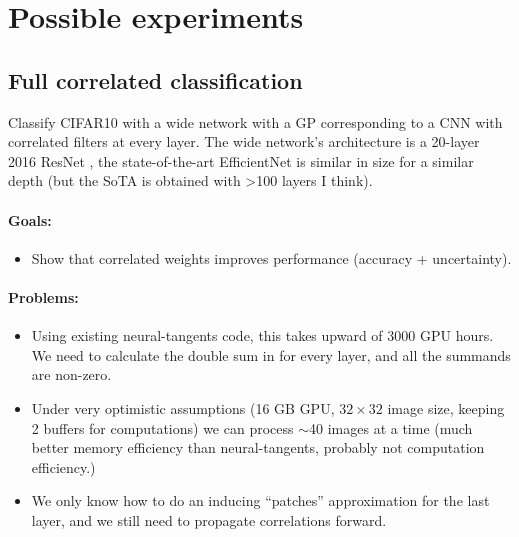 \documentclass{article} %
\begin{document}
\section{Possible experiments}
\subsection{Full correlated classification }
Classify CIFAR10 with a wide network with a GP corresponding to a CNN with
correlated filters at every layer. The wide network's architecture is a 20-layer
2016 ResNet \citep{he2016deep}, the state-of-the-art EfficientNet
\citep{tan19efficientnet} is similar in size for a similar depth (but the SoTA
is obtained with >100 layers I think).

\paragraph{Goals:}
\begin{itemize}
    \item Show that correlated weights improves performance (accuracy + uncertainty). 
\end{itemize}


\paragraph{Problems:}
\begin{itemize}
  \item Using existing neural-tangents code, this takes upward of 3000 GPU
    hours. We need to calculate the double sum in  for every
    layer, and all the summands are non-zero.
  \item Under very optimistic assumptions (16 GB GPU, $32\times 32$ image size,
    keeping 2 buffers for computations) we can process $\sim$40 images at a time
    (much better memory efficiency than neural-tangents, probably not
    computation efficiency.)
  \item We only know how to do an inducing ``patches'' approximation for the last
    layer, and we still need to propagate correlations forward.
\end{itemize}
\end{document}
